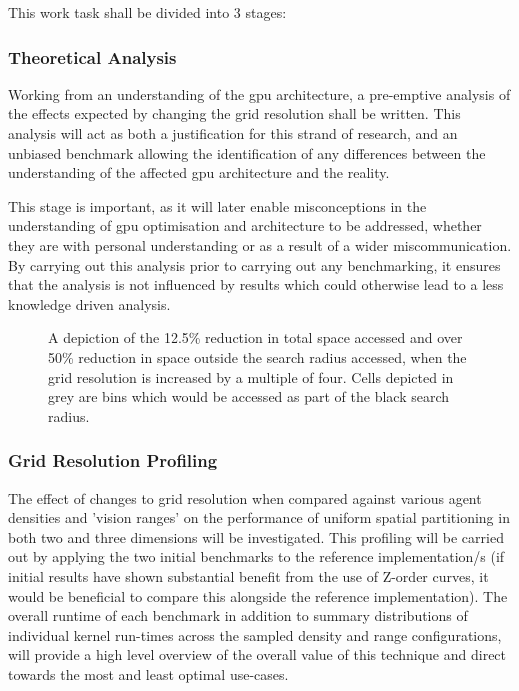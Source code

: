       This work task shall be divided into 3 stages:
      \subsubsection*{Theoretical Analysis}
        Working from an understanding of the \gls{gpu} architecture, a pre-emptive analysis of the effects expected by changing the grid resolution shall be written. This analysis will act as both a justification for this strand of research, and an unbiased benchmark allowing the identification of any differences between the understanding of the affected \gls{gpu} architecture and the reality. 
        
        This stage is important, as it will later enable misconceptions in the understanding of \gls{gpu} optimisation and architecture to be addressed, whether they are with personal understanding or as a result of a wider miscommunication. By carrying out this analysis prior to carrying out any benchmarking, it ensures that the analysis is not influenced  by results which could otherwise lead to a less knowledge driven analysis.
      
\begin{figure}[h]
  \begin{centering}
  \par\end{centering}
  \protect\caption[A depiction of the effect of changing the grid resolution used within uniform spatial partitioning.]{\label{fig:grid-resolution}A depiction of the 12.5\% reduction in total space accessed and over 50\% reduction in space outside the search radius accessed, when the grid resolution is increased by a multiple of four. Cells depicted in grey are bins which would be accessed as part of the black search radius.}
\end{figure}

      \subsubsection*{Grid Resolution Profiling}
        The effect of changes to grid resolution when compared against various agent densities and 'vision ranges' on the performance of uniform spatial partitioning in both two and three dimensions will be investigated. This profiling will be carried out by applying the two initial benchmarks to the reference implementation/s (if initial results have shown substantial benefit from the use of Z-order curves, it would be beneficial to compare this alongside the reference implementation). The overall runtime of each benchmark in addition to summary distributions of individual kernel run-times across the sampled density and range configurations, will provide a high level overview of the overall value of this technique and direct towards the most and least optimal use-cases.
        
